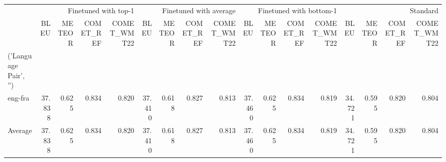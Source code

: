 \begin{tabular}{lrrrrrrrrrrrrrrrr}
\toprule
 & \multicolumn{4}{r}{Finetuned with top-1} & \multicolumn{4}{r}{Finetuned with average} & \multicolumn{4}{r}{Finetuned with bottom-1} & \multicolumn{4}{r}{Standard} \\
 & BLEU & METEOR & COMET_REF & COMET_WMT22 & BLEU & METEOR & COMET_REF & COMET_WMT22 & BLEU & METEOR & COMET_REF & COMET_WMT22 & BLEU & METEOR & COMET_REF & COMET_WMT22 \\
('Language Pair', '') &  &  &  &  &  &  &  &  &  &  &  &  &  &  &  &  \\
\midrule
eng-fra & 37.838 & 0.625 & 0.834 & 0.820 & 37.410 & 0.618 & 0.827 & 0.813 & 37.460 & 0.625 & 0.834 & 0.819 & 34.721 & 0.595 & 0.820 & 0.804 \\
Average & 37.838 & 0.625 & 0.834 & 0.820 & 37.410 & 0.618 & 0.827 & 0.813 & 37.460 & 0.625 & 0.834 & 0.819 & 34.721 & 0.595 & 0.820 & 0.804 \\
\bottomrule
\end{tabular}
